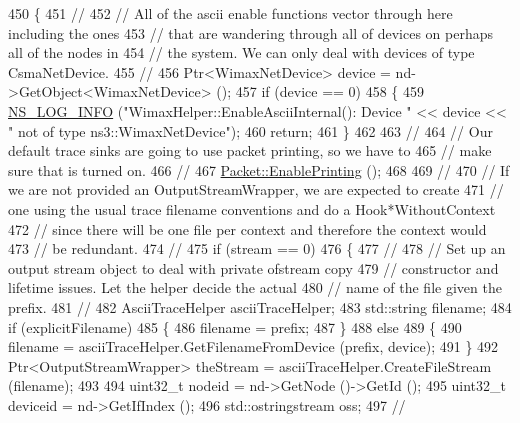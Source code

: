\begin{DoxyCode}
450 \{
451   \textcolor{comment}{//}
452   \textcolor{comment}{// All of the ascii enable functions vector through here including the ones}
453   \textcolor{comment}{// that are wandering through all of devices on perhaps all of the nodes in}
454   \textcolor{comment}{// the system.  We can only deal with devices of type CsmaNetDevice.}
455   \textcolor{comment}{//}
456   Ptr<WimaxNetDevice> device = nd->GetObject<WimaxNetDevice> ();
457   \textcolor{keywordflow}{if} (device == 0)
458     \{
459       \hyperlink{group__logging_gafbd73ee2cf9f26b319f49086d8e860fb}{NS\_LOG\_INFO} (\textcolor{stringliteral}{"WimaxHelper::EnableAsciiInternal(): Device "} << device << \textcolor{stringliteral}{" not of type
       ns3::WimaxNetDevice"});
460       \textcolor{keywordflow}{return};
461     \}
462 
463   \textcolor{comment}{//}
464   \textcolor{comment}{// Our default trace sinks are going to use packet printing, so we have to}
465   \textcolor{comment}{// make sure that is turned on.}
466   \textcolor{comment}{//}
467   \hyperlink{classns3_1_1Packet_ae17c0cd8e63e83df3c9273801e3d5d7f}{Packet::EnablePrinting} ();
468 
469   \textcolor{comment}{//}
470   \textcolor{comment}{// If we are not provided an OutputStreamWrapper, we are expected to create}
471   \textcolor{comment}{// one using the usual trace filename conventions and do a Hook*WithoutContext}
472   \textcolor{comment}{// since there will be one file per context and therefore the context would}
473   \textcolor{comment}{// be redundant.}
474   \textcolor{comment}{//}
475   \textcolor{keywordflow}{if} (stream == 0)
476     \{
477       \textcolor{comment}{//}
478       \textcolor{comment}{// Set up an output stream object to deal with private ofstream copy}
479       \textcolor{comment}{// constructor and lifetime issues.  Let the helper decide the actual}
480       \textcolor{comment}{// name of the file given the prefix.}
481       \textcolor{comment}{//}
482       AsciiTraceHelper asciiTraceHelper;
483       std::string filename;
484       \textcolor{keywordflow}{if} (explicitFilename)
485         \{
486           filename = prefix;
487         \}
488       \textcolor{keywordflow}{else}
489         \{
490           filename = asciiTraceHelper.GetFilenameFromDevice (prefix, device);
491         \}
492       Ptr<OutputStreamWrapper> theStream = asciiTraceHelper.CreateFileStream (filename);
493 
494       uint32\_t nodeid = nd->GetNode ()->GetId ();
495       uint32\_t deviceid = nd->GetIfIndex ();
496       std::ostringstream oss;
497       \textcolor{comment}{//}

\end{DoxyCode}

